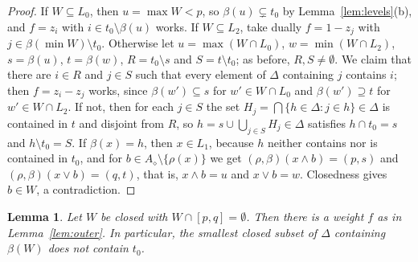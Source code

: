 \documentclass{amsart}
\newtheorem{lemma}[theorem]{Lemma}
\theoremstyle{definition}
\newcommand{\dm}{\diamond}
\begin{document}
\begin{proof}
If $W\subseteq L_0$, then $u=\max W<p$, so $\beta(u)\subsetneq t_0$ by Lemma~\ref{lem:levels}(b), and $f=z_i$ with $i\in t_0\setminus\beta(u)$ works. If $W\subseteq L_2$, take dually $f=1-z_j$ with $j\in\beta(\min W)\setminus t_0$. Otherwise let $u=\max(W\cap L_0)$, $w=\min(W\cap L_2)$, $s=\beta(u)$, $t=\beta(w)$, $R=t_0\setminus s$ and $S=t\setminus t_0$; as before, $R,S\ne\emptyset$. We claim that there are $i\in R$ and $j\in S$ such that every element of $\Delta$ containing $j$ contains $i$; then $f=z_i-z_j$ works, since $\beta(w')\subseteq s$ for $w'\in W\cap L_0$ and $\beta(w')\supseteq t$ for $w'\in W\cap L_2$. If not, then for each $j\in S$ the set $H_j=\bigcap\{h\in\Delta:j\in h\}\in\Delta$ is contained in $t$ and disjoint from $R$, so $h=s\cup\bigcup_{j\in S}H_j\in\Delta$ satisfies $h\cap t_0=s$ and $h\setminus t_0=S$. If $\beta(x)=h$, then $x\in L_1$, because $h$ neither contains nor is contained in $t_0$, and for $b\in A_\dm\setminus\{\rho(x)\}$ we get $(\rho,\beta)(x\wedge b)=(p,s)$ and $(\rho,\beta)(x\vee b)=(q,t)$, that is, $x\wedge b=u$ and $x\vee b=w$. Closedness gives $b\in W$, a contradiction.
\end{proof}

\begin{lemma}\label{lem:separation}
Let $W$ be closed with $W\cap[p,q]=\emptyset$. Then there is a weight $f$ as in Lemma~\ref{lem:outer}. In particular, the smallest closed subset of $\Delta$ containing $\beta(W)$ does not contain $t_0$.
\end{lemma}
\end{document}
